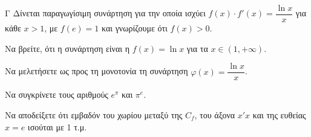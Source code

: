 \begin{thema}{Γ}
Δίνεται παραγωγίσιμη συνάρτηση για την οποία ισχύει $f(x) \cdot f'(x) = \dfrac{\ln x}{x}$ για κάθε $x>1$, με $f(e) = 1$ και γνωρίζουμε ότι $f(x) > 0$. 
\begin{erwthma}
  \item Να βρείτε, ότι η συνάρτηση είναι η $f(x) = \ln x$ για τα $x \in (1, +\infty)$.
  \item Να μελετήσετε ως προς τη μονοτονία τη συνάρτηση $\varphi(x) = \dfrac{\ln x}{x}$.
  \item Να συγκρίνετε τους αριθμούς $e^\pi$ και $\pi^e$. 
  \item Να αποδείξετε ότι εμβαδόν του χωρίου μεταξύ της $C_f$, του άξονα $x'x$ και της ευθείας $x=e$ ισούται με 1 τ.μ.
\end{erwthma}
\end{thema}
